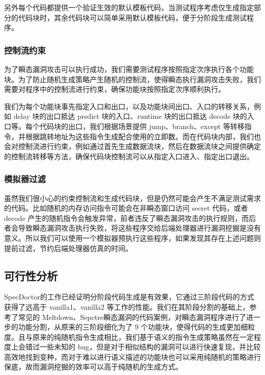另外每个代码都提供一个验证生效的默认模板代码，当测试程序考虑仅生成指定部分的代码块时，其余代码块可以简单采用默认模板代码，便于分阶段生成测试程序。

\subsubsection{控制流约束}

为了瞬态漏洞攻击可以执行成功，我们需要测试程序按照指定次序执行各个功能块。为了防止随机生成策略产生随机的控制流，使得瞬态执行漏洞攻击失败，我们需要对程序中的控制流进行约束，确保功能块按照指定次序顺利执行。\par

我们为每个功能块事先指定入口和出口，以及功能块间出口、入口的转移关系，例如 delay 块的出口抵达 predict 块的入口、runtime 块的出口抵达 decode 块的入口等。每个代码块的出口，我们根据场景提供 jump、branch、except 等转移指令，并根据跳转地址为这些指令生成配合使用的立即数。而在代码块内部，我们也会对控制流进行约束，例如通过首先生成数据流块，然后在数据流块之间提供确定的控制流转移等方法，确保代码块控制流可以从指定入口进入、指定出口退出。\par

\subsubsection{模拟器过滤}

虽然我们很小心的约束控制流和生成代码块，但是仍然可能会产生不满足测试需求的代码。比如随机的内存访问指令可能会在非瞬态窗口访问 secret 代码，或者 decode 产生的随机指令会触发异常，前者违反了瞬态漏洞攻击的执行规则，而后者会导致瞬态漏洞攻击执行失败，将这些程序交给后端处理器进行漏洞挖掘是没有意义。所以我们可以使用一个模拟器预执行这些程序，如果发现其存在上述问题则提前过滤，节约后端处理器仿真的时间。

\subsection{可行性分析}

SpecDoctor\cite{hur2022specdoctor}的工作已经证明分阶段代码生成是有效果，它通过三阶段代码的方式获得了远高于 vanilla1、vanilla2 等工作的性能。我们在其阶段分割的基础上，参考了常见的 Meltdown、Sepctre瞬态漏洞的代码案例，对瞬态漏洞程序进行了进一步的功能分割，从原来的三阶段细化为了 9 个功能块，使得代码的生成更加细粒度。且与原来的纯随机指令生成相比，我们基于语义的指令生成策略虽然在一定程度上会错过一些未知的 bug，但是对于相似结构的漏洞可以进行快速复现\cite{moghimi2020medusa}\cite{xiao2019speechminer}，并比较高效地找到变种，而对于难以进行语义描述的功能块也可以采用纯随机的策略进行保底，故而漏洞挖掘的效率可以高于纯随机的生成方式。\par

